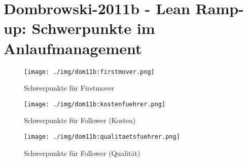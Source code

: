 \section{Dombrowski-2011b - Lean Ramp-up: Schwerpunkte im Anlaufmanagement}
\begin{figure}[h!]
 \centering
 \texttt{[image: ./img/dom11b:firstmover.png]}
 \caption[Schwerpunkte für Firstmover]{Schwerpunkte für Firstmover \autocite{Dombrowski2011b}}
 \label{fig:dom11b:firstmover}
% 
% 
 \centering
 \texttt{[image: ./img/dom11b:kostenfuehrer.png]}
 \caption[Schwerpunkte für Follower (Kosten)]{Schwerpunkte für Follower (Kosten) \autocite{Dombrowski2011b}}
 \label{fig:dom11b:kostenfuehrer}
% 
% 
 \centering
 \texttt{[image: ./img/dom11b:qualitaetsfuehrer.png]}
 \caption[Schwerpunkte für Follower (Qualität)]{Schwerpunkte für Follower (Qualität) \autocite{Dombrowski2011b}}
 \label{fig:dom11b:qualitaetsfuehrer}
\end{figure}
\restoregeometry